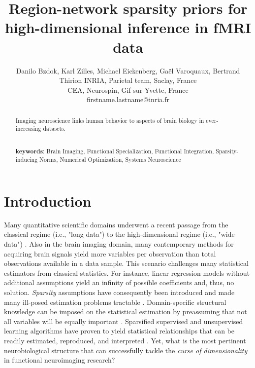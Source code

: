 \documentclass{article} %
\title{Region-network sparsity priors for high-dimensional inference in fMRI data}
\begin{document}
\author{Danilo Bzdok, Karl Zilles, Michael Eickenberg,
  Ga\"el Varoquaux, Bertrand Thirion
  INRIA, Parietal team, Saclay, France\\
  CEA, Neurospin, Gif-sur-Yvette, France\\
  firstname.lastname@inria.fr}

\maketitle

\begin{abstract}
Imaging neuroscience links human behavior to aspects of brain
biology in ever-increasing datasets.


\textbf{\\keywords}:
Brain Imaging, Functional Specialization, Functional Integration,
Sparsity-inducing Norms, Numerical Optimization, Systems Neuroscience

\end{abstract}



\section{Introduction}
Many quantitative scientific domains underwent a
recent passage from the classical regime (i.e., "long data")  to
the high-dimensional regime (i.e., "wide data")
\citep{jordan2015massive}.
Also in the brain imaging domain,
many contemporary methods for acquiring brain signals yield
more variables per observation than
total observations available in a data sample.
This scenario challenges many statistical estimators from
classical statistics.
For instance,
linear regression models without additional assumptions
yield an infinity of possible coefficients
and, thus, no solution.
%
\textit{Sparsity} assumptions have consequently been
introduced and made many ill-posed estimation problems tractable
\cite{buhlmann2011statistics, hastie2015statistical}.
Domain-specific structural knowledge can be imposed on the 
statistical estimation by preassuming that not all variables will be
equally important
\citep{bach2012optimization}.
Sparsified supervised and unsupervised
learning algorithms have proven to yield
statistical relationships that can be readily
estimated, reproduced, and interpreted
\cite{giraud2014introduction}.
%
Yet, what is the most pertinent neurobiological structure
that can successfully tackle the
\textit{curse of dimensionality} in
functional neuroimaging research?
\end{document}
